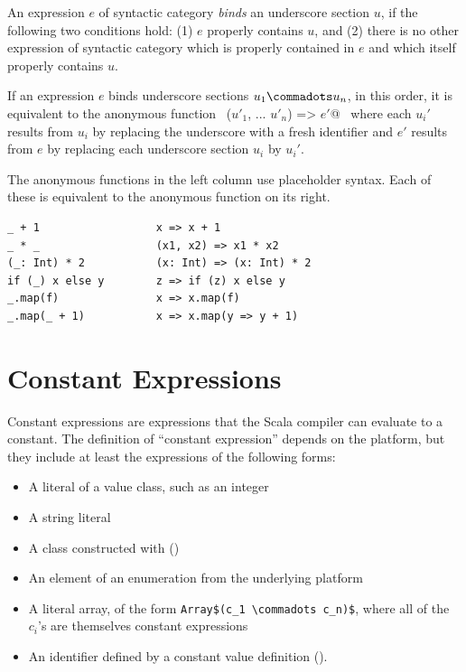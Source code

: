 An expression $e$ of syntactic category  {\em binds} an underscore section
$u$, if the following two conditions hold: (1) $e$ properly contains $u$, and
(2) there is no other expression of syntactic category  
which is properly contained in $e$ and which itself properly contains $u$.

If an expression $e$ binds underscore sections $u_1 \commadots u_n$, in this order, it is equivalent to 
the anonymous function ~\lstinline@($u'_1$, ... $u'_n$) => $e'$@~
where each $u_i'$ results from $u_i$ by replacing the underscore with a fresh identifier and
$e'$ results from $e$ by replacing each underscore section $u_i$ by $u_i'$.

\example The anonymous functions in the left column use placeholder
syntax. Each of these is equivalent to the anonymous function on its right.

\begin{lstlisting}
_ + 1                  x => x + 1
_ * _                  (x1, x2) => x1 * x2
(_: Int) * 2           (x: Int) => (x: Int) * 2
if (_) x else y        z => if (z) x else y
_.map(f)               x => x.map(f)
_.map(_ + 1)           x => x.map(y => y + 1)
\end{lstlisting}

\section{Constant Expressions}\label{sec:constant-expression}

Constant expressions are expressions that the Scala compiler can evaluate to a constant.
The definition of ``constant expression'' depends on the platform, but they
include at least the expressions of the following forms:
\begin{itemize}
\item A literal of a value class, such as an integer
\item A string literal
\item A class constructed with  ()
\item An element of an enumeration from the underlying platform
\item A literal array, of the form
      \lstinline^Array$(c_1 \commadots c_n)$^,
      where all of the $c_i$'s are themselves constant expressions
\item An identifier defined by a constant value definition ().
\end{itemize}


